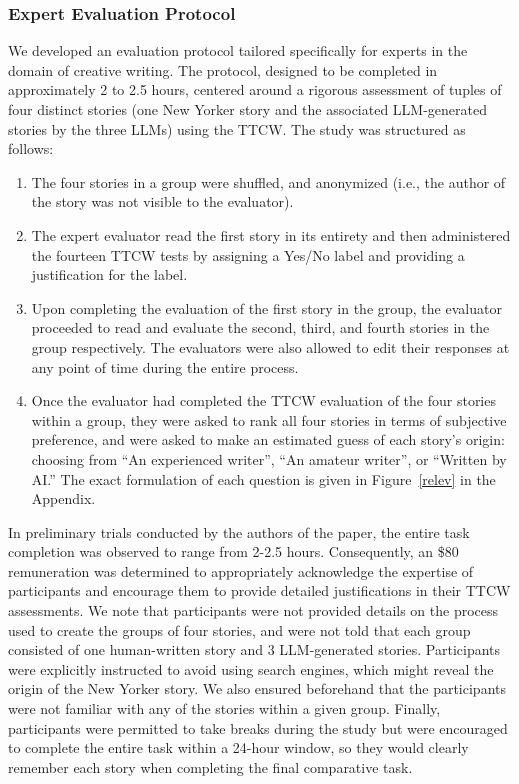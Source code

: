 \subsubsection{Expert Evaluation Protocol}
\label{experteval}
We developed an evaluation protocol tailored specifically for experts in the domain of creative writing. The protocol, designed to be completed in approximately 2 to 2.5 hours, centered around a rigorous assessment of tuples of four distinct stories (one New Yorker story and the associated LLM-generated stories by the three LLMs) using the TTCW. The study was structured as follows:

\begin{enumerate}
    \item The four stories in a group were shuffled, and anonymized (i.e., the author of the story was not visible to the evaluator).
    \item The expert evaluator read the first story in its entirety and then administered the fourteen TTCW tests by assigning a Yes/No label and providing a justification for the label.
    \item Upon completing the evaluation of the first story in the group, the evaluator proceeded to read and evaluate the second, third, and fourth stories in the group respectively. The evaluators were also allowed to edit their responses at any point of time during the entire process.
    \item Once the evaluator had completed the TTCW evaluation of the four stories within a group, they were asked to rank all four stories in terms of subjective preference, and were asked to make an estimated guess of each story's origin: choosing from ``An experienced writer'', ``An amateur writer'', or ``Written by AI.'' The exact formulation of each question is given in Figure~\ref{relev} in the Appendix.
\end{enumerate}

In preliminary trials conducted by the authors of the paper, the entire task completion was observed to range from 2-2.5 hours. Consequently, an \$80 remuneration was determined to appropriately acknowledge the expertise of participants and encourage them to provide detailed justifications in their TTCW assessments. We note that participants were not provided details on the process used to create the groups of four stories, and were not told that each group consisted of one human-written story and 3 LLM-generated stories. Participants were explicitly instructed to avoid using search engines, which might reveal the origin of the New Yorker story. We also ensured beforehand that the participants were not familiar with any of the stories within a given group. Finally, participants were permitted to take breaks during the study but were encouraged to complete the entire task within a 24-hour window, so they would clearly remember each story when completing the final comparative task.

